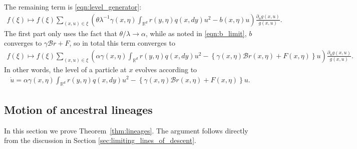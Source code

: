 \documentclass[12pt]{article}
\newcommand{\IR}{\mathbb R}
\newcommand{\DG}{\mathcal{B}}  %
\newcommand{\lp}{\xi}              %
\begin{document}
The remaining term is \eqref{eqn:level_generator}:
\begin{align*}
    f(\lp)
    \mapsto
    f(\lp)
    \sum_{(x, u) \in \lp}
    \left(
    \theta
        \lambda^{-1} \gamma(x,\eta) \int_{\IR^d} r(y, \eta) q(x, dy) u^2
        -
        b(x, \eta)u
    \right)
    \frac{\partial_u g(x,u)}{g(x,u)} .
\end{align*}
The first part only uses the fact that $\theta/\lambda \to \alpha$,
while as noted in \eqref{eqn:b_limit}, $b$ converges to $\gamma \DG r + F$,
so in total this term converges to
\begin{align*}
    f(\lp)
    \mapsto
    f(\lp)
    \sum_{(x, u) \in \lp}
    \left(
    \alpha
        \gamma(x,\eta) \int_{\IR^d} r(y, \eta) q(x, dy) u^2
        -
        \left\{
            \gamma(x, \eta) \DG r(x, \eta) + F(x, \eta)
        \right\} u
    \right)
    \frac{\partial_u g(x,u)}{g(x,u)} .
\end{align*}
In other words, the level of a particle at $x$ evolves according to
\begin{align*}
    \dot u
    =
    \alpha
        \gamma(x,\eta) \int_{\IR^d} r(y, \eta) q(x, dy) u^2
        -
        \left\{
            \gamma(x, \eta) \DG r(x, \eta) + F(x, \eta)
        \right\} u .
\end{align*}



\subsection{Motion of ancestral lineages}

In this section we prove Theorem~\ref{thm:lineages}.
The argument follows directly from the discussion in Section \ref{sec:limiting_lines_of_descent}.
\end{document}
